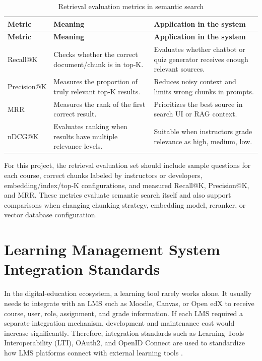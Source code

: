 \begin{longtable}{|p{3cm}|p{4.2cm}|p{6.8cm}|}
\caption{Retrieval evaluation metrics in semantic search}
\label{tab:retrieval-metrics}\\
\hline
\textbf{Metric} & \textbf{Meaning} & \textbf{Application in the system} \\
\hline
\endfirsthead
\hline
\textbf{Metric} & \textbf{Meaning} & \textbf{Application in the system} \\
\hline
\endhead
Recall@K & Checks whether the correct document/chunk is in top-K. & Evaluates whether chatbot or quiz generator receives enough relevant sources. \\
\hline
Precision@K & Measures the proportion of truly relevant top-K results. & Reduces noisy context and limits wrong chunks in prompts. \\
\hline
MRR & Measures the rank of the first correct result. & Prioritizes the best source in search UI or RAG context. \\
\hline
nDCG@K & Evaluates ranking when results have multiple relevance levels. & Suitable when instructors grade relevance as high, medium, low. \\
\hline
\end{longtable}

For this project, the retrieval evaluation set should include sample
questions for each course, correct chunks labeled by instructors or
developers, embedding/index/top-K configurations, and measured Recall@K,
Precision@K, and MRR. These metrics evaluate semantic search itself and
also support comparisons when changing chunking strategy, embedding model,
reranker, or vector database configuration.

\section{Learning Management System Integration Standards}
\label{sec:lms-integration-standards}

In the digital-education ecosystem, a learning tool rarely works alone.
It usually needs to integrate with an LMS such as Moodle, Canvas, or Open
edX to receive course, user, role, assignment, and grade information. If
each LMS required a separate integration mechanism, development and
maintenance cost would increase significantly. Therefore, integration
standards such as Learning Tools Interoperability (LTI), OAuth2, and
OpenID Connect are used to standardize how LMS platforms connect with
external learning tools \cite{lti-advantage,openedx-lti}.

